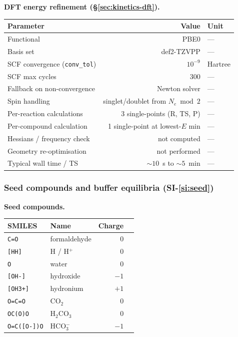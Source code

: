 \bigskip

\noindent\textbf{DFT energy refinement (\S\ref{sec:kinetics-dft}).}\par\nopagebreak
\noindent\begin{tabular}{p{5cm}rl}
\toprule
Parameter & Value & Unit \\
\midrule
Functional & PBE0 & --- \\
Basis set & def2-TZVPP & --- \\
SCF convergence (\texttt{conv\_tol}) & $10^{-9}$ & Hartree \\
SCF max cycles & 300 & --- \\
Fallback on non-convergence & Newton solver & --- \\
Spin handling & singlet/doublet from $N_e \bmod 2$ & --- \\
Per-reaction calculations & 3 single-points (R, TS, P) & --- \\
Per-compound calculation & 1 single-point at lowest-$E$ min & --- \\
Hessians / frequency check & not computed & --- \\
Geometry re-optimisation & not performed & --- \\
Typical wall time / TS & $\sim 10$~s to $\sim 5$~min & --- \\
\bottomrule
\end{tabular}


\subsubsection{Seed compounds and buffer equilibria (SI-\ref{si:seed})}
\label{sec:params-seed}

\noindent\textbf{Seed compounds.}\par\nopagebreak
\noindent\begin{tabular}{p{4cm}p{4cm}rp{4cm}}
\toprule
SMILES & Name & Charge \\
\midrule
\texttt{C=O}        & formaldehyde   & $0$ \\
\texttt{[HH]}       & H / H$^+$      & $0$ \\
\texttt{O}          & water          & $0$ \\
\texttt{[OH-]}      & hydroxide      & $-1$ \\
\texttt{[OH3+]}     & hydronium      & $+1$ \\
\texttt{O=C=O}      & CO$_2$         & $0$ \\
\texttt{OC(O)O}     & H$_2$CO$_3$    & $0$ \\
\texttt{O=C([O-])O} & HCO$_3^-$      & $-1$ \\
\bottomrule
\end{tabular}

